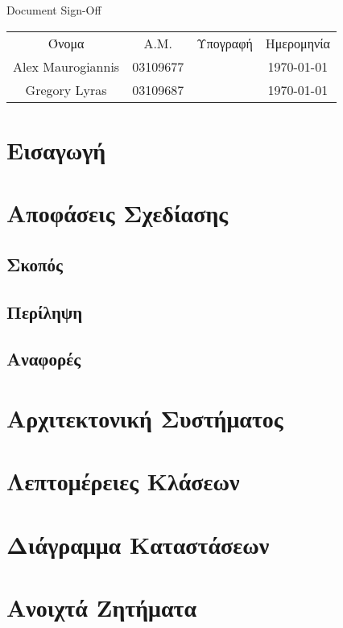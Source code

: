 





\tableofcontents


Document Sign-Off

\begin{table}[h]
    \begin{tabular}{| c | c | c | c |}
        Όνομα & Α.Μ. & Υπογραφή & Ημερομηνία \\
        Alex Maurogiannis & 03109677 & & \today \\
        Gregory Lyras & 03109687 & & \today \\
    \end{tabular}
\end{table}

\chapter{Εισαγωγή}


\chapter{Αποφάσεις Σχεδίασης}
    \section{Σκοπός}
    \section{Περίληψη}
    \section{Αναφορές}
\chapter{Αρχιτεκτονική Συστήματος}
\chapter{Λεπτομέρειες Κλάσεων}
\chapter{Διάγραμμα Καταστάσεων}
\chapter{Ανοιχτά Ζητήματα}

